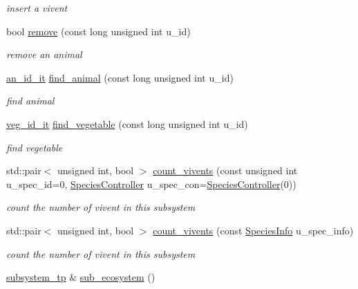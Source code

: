 \begin{DoxyCompactItemize}
\begin{DoxyCompactList}\small\item\em insert a vivent \end{DoxyCompactList}\item 
bool \hyperlink{classSubsystemContainer_a4aebe195bf137309f42a528dd3771be0}{remove} (const long unsigned int u\_\-id)
\begin{DoxyCompactList}\small\item\em remove an animal \end{DoxyCompactList}\item 
\hyperlink{classSubsystemContainer_a016775688f9d4baed66e8bdc3fbc0ec9}{an\_\-id\_\-it} \hyperlink{classSubsystemContainer_a4d63b50ac6eefd3f322524fe99435574}{find\_\-animal} (const long unsigned int u\_\-id)
\begin{DoxyCompactList}\small\item\em find animal \end{DoxyCompactList}\item 
\hyperlink{classSubsystemContainer_a646e7cb7968fdb78105d62bb685aca81}{veg\_\-id\_\-it} \hyperlink{classSubsystemContainer_a403e286ac23c44b28e82acb3613d88c2}{find\_\-vegetable} (const long unsigned int u\_\-id)
\begin{DoxyCompactList}\small\item\em find vegetable \end{DoxyCompactList}\item 
std::pair$<$ unsigned int, bool $>$ \hyperlink{classSubsystemContainer_a383ac4ca92778f71ebc8d6610382b825}{count\_\-vivents} (const unsigned int u\_\-spec\_\-id=0, \hyperlink{classSpeciesController}{SpeciesController} u\_\-spec\_\-con=\hyperlink{classSpeciesController}{SpeciesController}(0))
\begin{DoxyCompactList}\small\item\em count the number of vivent in this subsystem \end{DoxyCompactList}\item 
std::pair$<$ unsigned int, bool $>$ \hyperlink{classSubsystemContainer_a4e9a8aabfe39a9a3abb283da0dc5acfa}{count\_\-vivents} (const \hyperlink{structSpeciesInfo}{SpeciesInfo} u\_\-spec\_\-info)
\begin{DoxyCompactList}\small\item\em count the number of vivent in this subsystem \end{DoxyCompactList}\item 
\hypertarget{classSubsystemContainer_a706f074071c227f63e6b7095fabee40f}{
\hyperlink{classSubsystemContainer_a2c517c44fccdecc58869c24ab6d3f667}{subsystem\_\-tp} \& \hyperlink{classSubsystemContainer_a706f074071c227f63e6b7095fabee40f}{sub\_\-ecosystem} ()}
\label{classSubsystemContainer_a706f074071c227f63e6b7095fabee40f}


\end{DoxyCompactItemize}
